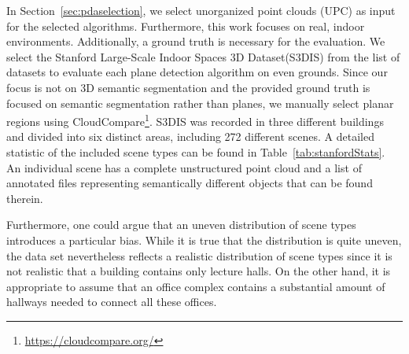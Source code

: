 \documentclass[main.tex]{subfiles}
\begin{document}
In Section~\ref{sec:pdaselection}, we select unorganized point clouds (UPC) as input for the selected algorithms. Furthermore, this work focuses on real, indoor environments.
Additionally, a ground truth is necessary for the evaluation.
We select the Stanford Large-Scale Indoor Spaces 3D Dataset(S3DIS)\cite{2017arXiv170201105A} from the list of datasets to evaluate each plane detection algorithm on even grounds.
Since our focus is not on 3D semantic segmentation and the provided ground truth is focused on semantic segmentation rather than planes, we manually select planar regions using CloudCompare\footnote{\href{https://cloudcompare.org/}{https://cloudcompare.org/}}.
S3DIS was recorded in three different buildings and divided into six distinct areas, including 272 different scenes. A detailed statistic of the included scene types can be found in Table~\ref{tab:stanfordStats}.
An individual scene has a complete unstructured point cloud and a list of annotated files representing semantically different objects that can be found therein.

Furthermore, one could argue that an uneven distribution of scene types introduces a particular bias. While it is true that the distribution is quite uneven, the data set nevertheless reflects a realistic distribution of scene types since
it is not realistic that a building contains only lecture halls. On the other hand, it is appropriate to assume that an office complex contains a substantial amount of hallways needed to connect all these offices.
\end{document}
